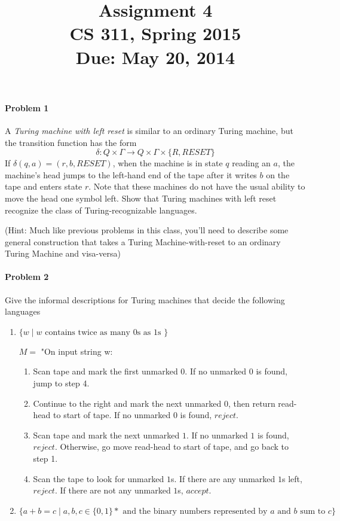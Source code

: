 \documentclass{article}
\title{\vspace{-3ex} \bf Assignment 4 \\[1ex]\rm\normalsize CS 311, Spring 2015 \\ Due: May 20, 2014}
\date{}
\author{}
\begin{document}
\maketitle
\paragraph{Problem 1}
 A {\em Turing machine with left reset} is similar to an ordinary Turing machine, but the 
 transition function has the form
  \begin{displaymath}
    \delta : Q \times \Gamma \to Q \times \Gamma \times \{R,RESET\}
  \end{displaymath}
If $\delta (q,a) = (r,b,RESET)$, when the machine is in state $q$ reading an $a$, the machine's 
head jumps to the left-hand end of the tape after it writes $b$ on the tape and enters state 
$r$. Note that these machines do not have the usual ability to move the head one symbol left. 
Show that Turing machines with left reset recognize the class of Turing-recognizable languages.

  (Hint: Much like previous problems in this class, you'll need to describe some general 
  construction that takes a Turing Machine-with-reset to an ordinary Turing Machine and visa-versa)

\paragraph{Problem 2}
Give the informal descriptions for Turing machines that decide the following languages
\begin{enumerate}[\indent a)]
    \item $\{w \;|\; w \text{ contains twice as many 0s as 1s }\}$
    
$M = $ "On input string w:
\begin{enumerate}
	\item Scan tape and mark the first unmarked $0$. If no unmarked $0$ is found, jump to step 4.
	\item Continue to the right and mark the next unmarked $0$, then return read-head to start of tape. If no unmarked $0$ is found, $reject$.
	\item Scan tape and mark the next unmarked $1$. If no unmarked $1$ is found, $reject$. Otherwise, go move read-head to start of tape, and go back to step 1.
	\item Scan the tape to look for unmarked $1$s. If there are any unmarked $1$s left, $reject$. If there are not any unmarked $1$s, $accept$.
    \end{enumerate}
    \item $\{a+b=c \;|\; a,b,c \in \{0,1\}* \text{ and the binary numbers represented by $a$ 
    and $b$ sum to $c$} \}$
\end{enumerate}
\end{document}

